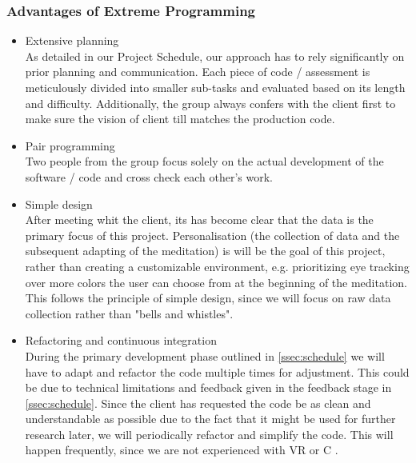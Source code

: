 \documentclass[coverpage,lineno]{../custom}
\begin{document}
\subsubsection{Advantages of Extreme Programming}
\begin{itemize}
    \item Extensive planning \\
    As detailed in our Project Schedule, our approach has to rely significantly on prior planning and communication. Each piece of code / assessment is meticulously divided into smaller sub-tasks and evaluated based on its length and difficulty. Additionally, the group always confers with the client first to make sure the vision of client till matches the production code.
    \item Pair programming \\
    Two people from the group focus solely on the actual development of the software / code and cross check each other's work. 
    \item Simple design \\
    After meeting whit the client, its has become clear that the data is the primary focus of this project. Personalisation (the collection of data and the subsequent adapting of the meditation) is will be the goal of this project, rather than creating a customizable environment, e.g. prioritizing eye tracking over more colors the user can choose from at the beginning of the meditation. This follows the principle of simple design, since we will focus on raw data collection rather than "bells and whistles".
    \item Refactoring and continuous integration \\
     During the primary development phase outlined in \cref{ssec:schedule} we will have to adapt and refactor the code multiple times for adjustment. This could be due to technical limitations and feedback given in the feedback stage in \cref{ssec:schedule}. Since the client has requested the code be as clean and understandable as possible due to the fact that it might be used for further research later, we will periodically refactor and simplify the code. This will happen frequently, since we are not experienced with VR or C \sharp.
\end{itemize}
\end{document}

